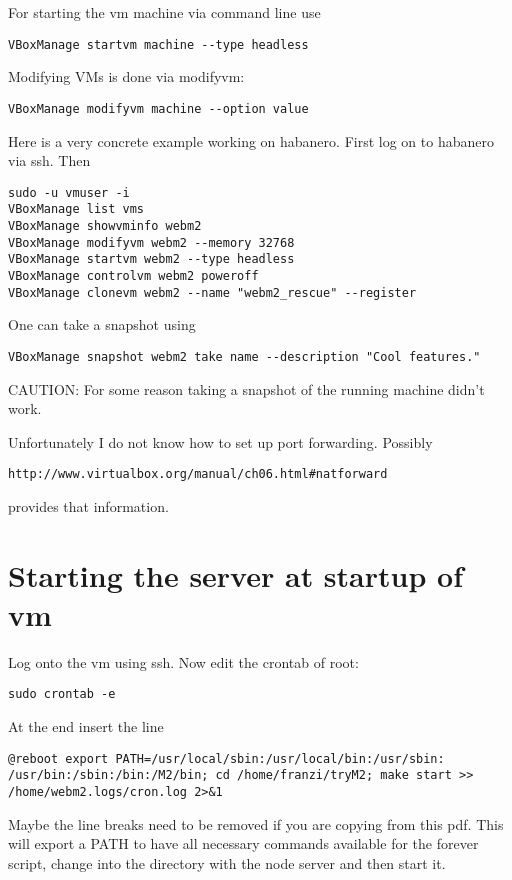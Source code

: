 \documentclass[a4paper]{book}
\begin{document}
For starting the vm machine via command line use
\begin{verbatim}
VBoxManage startvm machine --type headless
\end{verbatim}

Modifying VMs is done via modifyvm:
\begin{verbatim}
VBoxManage modifyvm machine --option value
\end{verbatim}

Here is a very concrete example working on habanero. First log on to habanero via ssh. Then
\begin{verbatim}
sudo -u vmuser -i
VBoxManage list vms
VBoxManage showvminfo webm2
VBoxManage modifyvm webm2 --memory 32768
VBoxManage startvm webm2 --type headless
VBoxManage controlvm webm2 poweroff
VBoxManage clonevm webm2 --name "webm2_rescue" --register
\end{verbatim}

One can take a snapshot using
\begin{verbatim}
VBoxManage snapshot webm2 take name --description "Cool features."
\end{verbatim}
CAUTION: For some reason taking a snapshot of the running machine didn't work.

Unfortunately I do not know how to set up port forwarding. Possibly
\begin{verbatim}
http://www.virtualbox.org/manual/ch06.html#natforward
\end{verbatim}
provides that information.

\section{Starting the server at startup of vm}
Log onto the vm using ssh. Now edit the crontab of root:
\begin{verbatim}
sudo crontab -e
\end{verbatim}
At the end insert the line
\begin{verbatim}
@reboot export PATH=/usr/local/sbin:/usr/local/bin:/usr/sbin:
/usr/bin:/sbin:/bin:/M2/bin; cd /home/franzi/tryM2; make start >>
/home/webm2.logs/cron.log 2>&1
\end{verbatim}
Maybe the line breaks need to be removed if you are copying from this pdf.
This will export a PATH to have all necessary commands available for the forever script, change into the directory with the node server and then start it.
\end{document}
